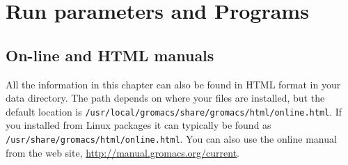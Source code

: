 %
%
%
%
%
%

\chapter{Run parameters and Programs}
\label{ch:programs}

\section{On-line and HTML manuals}
All the information in this chapter can also be found in HTML
format in your {\gromacs} data directory. The path depends on
where your files are installed, but the default location is
{\tt /usr/local/gromacs/share/gromacs/html/online.html}.
If you installed from Linux packages it can typically be found as
{\tt /usr/share/gromacs/html/online.html}.
You can also use the online manual from the {\gromacs} web site,
\url{http://manual.gromacs.org/current}.

